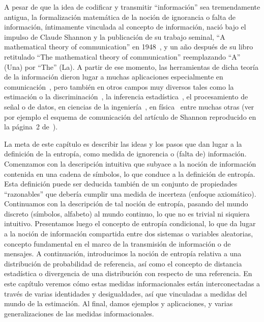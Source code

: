 A  pesar  de  que  la  idea de  codificar  y  transmitir  ``informaci\'on''  sea
tremendamente  antigua,  la  formalizaci\'on  matem\'atica  de  la  noci\'on  de
ignorancia  o falta  de informaci\'on,  \'intimamente vinculada  al concepto  de
informaci\'on, naci\'o bajo  el impulso de Claude Shannon y  la publicaci\'on de
su   trabajo   seminal,   ``A   mathematical  theory   of   communication''   en
1948~\cite{Sha48},  y   un  a\~no  despu\'es   de  su  libro   retitulado  ``The
mathematical  theory of  communication''  reemplazando ``A''  (Una) por  ``The''
(La).  A  partir de  ese  momento,  las herramientas  de  dicha  teor\'ia de  la
informaci\'on   dieron   lugar   a    muchas   aplicaciones   especialmente   en
comunicaci\'on~\cite{CovTho06, Ver98, Gal01},
pero tambi\'en  en otros  campos muy  diversos tales como  la estimaci\'on  o la
discriminaci\'on~\cite{CovTho06, Kay93, Bos07, LehCas98},
la inferencia  estad\'istica~\cite{Rob07, Par06}, el procesamiento  de se\~nal o
de datos\cite{PhiRou92, EbeMol00, Bas13},
en  ciencias  de la  ingenier\'ia~\cite{Arn01,  Kap89,  KapKes92, PhiRou92},  en
f\'isica~\cite{Arn01, OhyPet93, Mer18}
entre muchas otras (ver por ejemplo  el esquema de comunicaci\'on del art\'iculo
de Shannon reproducido en la p\'agina~2 de~\cite{CovTho06}).

La meta de este cap\'itulo es describir las ideas y los pasos que dan lugar a la
definici\'on  de  la  entrop\'ia,  como   medida  de  ignorencia  o  (falta  de)
informaci\'on.   Comenzamos con  la  descripci\'on intuitiva  que  subyace a  la
noci\'on de informaci\'on contenida en una  cadena de s\'imbolos, lo que conduce
a la definici\'on de entrop\'ia.  Esta definici\'on puede ser deducida tambi\'en
de un conjunto de propiedades ``razonables'' que deber\'ia cumplir una medida de
incerteza  (enfoque  axiom\'atico).  Continuamos  con  la  descripci\'on de  tal
noci\'on de  entrop\'ia, pasando  del mundo  discreto (s\'imbolos,  alfabeto) al
mundo continuo, lo  que no es trivial ni siquiera  intuitivo.  Presentamos luego
el  concepto  de entrop\'ia  condicional,  lo  que da  lugar  a  la noci\'on  de
informaci\'on  compartida entre  dos sistemas  o variables  aleatorias, concepto
fundamental en  el marco de la  transmisi\'on de informaci\'on o  de mensajes. A
continuaci\'on,  introducimos   la  noci\'on   de  entrop\'ia  relativa   a  una
distribuci\'on  de  probabilidad  de  referencia,  as\'i  como  el  concepto  de
distancia estad\'istica o divergencia de  una distribuci\'on con respecto de una
referencia.  En este  cap\'itulo  veremos c\'omo  estas medidas  informacionales
est\'an interconectadas a trav\'es de  varias identidades y desigualdades, as\'i
que vinculadas a medidas del mundo  de la estimaci\'on. Al final, damos ejemplos
y aplicaciones, y varias generalizaciones de las medidas informacionales.

\


